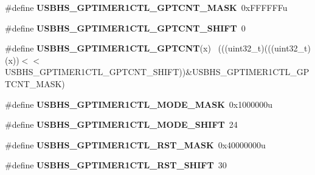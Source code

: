 \begin{DoxyCompactItemize}
\item 
\hypertarget{group___u_s_b_h_s___register___masks_gac15340f15cd15fc43bc24e8092de56a7}{}\#define {\bfseries U\+S\+B\+H\+S\+\_\+\+G\+P\+T\+I\+M\+E\+R1\+C\+T\+L\+\_\+\+G\+P\+T\+C\+N\+T\+\_\+\+M\+A\+S\+K}~0x\+F\+F\+F\+F\+F\+Fu\label{group___u_s_b_h_s___register___masks_gac15340f15cd15fc43bc24e8092de56a7}

\item 
\hypertarget{group___u_s_b_h_s___register___masks_ga408ccd372e46369e1bee04e81c086e9a}{}\#define {\bfseries U\+S\+B\+H\+S\+\_\+\+G\+P\+T\+I\+M\+E\+R1\+C\+T\+L\+\_\+\+G\+P\+T\+C\+N\+T\+\_\+\+S\+H\+I\+F\+T}~0\label{group___u_s_b_h_s___register___masks_ga408ccd372e46369e1bee04e81c086e9a}

\item 
\hypertarget{group___u_s_b_h_s___register___masks_gaa22d27c6e418f4bc92e2f861c50dd464}{}\#define {\bfseries U\+S\+B\+H\+S\+\_\+\+G\+P\+T\+I\+M\+E\+R1\+C\+T\+L\+\_\+\+G\+P\+T\+C\+N\+T}(x)                        ~(((uint32\+\_\+t)(((uint32\+\_\+t)(x))$<$$<$U\+S\+B\+H\+S\+\_\+\+G\+P\+T\+I\+M\+E\+R1\+C\+T\+L\+\_\+\+G\+P\+T\+C\+N\+T\+\_\+\+S\+H\+I\+F\+T))\&U\+S\+B\+H\+S\+\_\+\+G\+P\+T\+I\+M\+E\+R1\+C\+T\+L\+\_\+\+G\+P\+T\+C\+N\+T\+\_\+\+M\+A\+S\+K)\label{group___u_s_b_h_s___register___masks_gaa22d27c6e418f4bc92e2f861c50dd464}

\item 
\hypertarget{group___u_s_b_h_s___register___masks_ga504d07a8ef3af71eb0c166dcc52f4dfb}{}\#define {\bfseries U\+S\+B\+H\+S\+\_\+\+G\+P\+T\+I\+M\+E\+R1\+C\+T\+L\+\_\+\+M\+O\+D\+E\+\_\+\+M\+A\+S\+K}~0x1000000u\label{group___u_s_b_h_s___register___masks_ga504d07a8ef3af71eb0c166dcc52f4dfb}

\item 
\hypertarget{group___u_s_b_h_s___register___masks_gac2c6ef7c3e09ab0e79f78d92f3d02c3a}{}\#define {\bfseries U\+S\+B\+H\+S\+\_\+\+G\+P\+T\+I\+M\+E\+R1\+C\+T\+L\+\_\+\+M\+O\+D\+E\+\_\+\+S\+H\+I\+F\+T}~24\label{group___u_s_b_h_s___register___masks_gac2c6ef7c3e09ab0e79f78d92f3d02c3a}

\item 
\hypertarget{group___u_s_b_h_s___register___masks_ga56e5e0b77501244d090c8c61bf48109f}{}\#define {\bfseries U\+S\+B\+H\+S\+\_\+\+G\+P\+T\+I\+M\+E\+R1\+C\+T\+L\+\_\+\+R\+S\+T\+\_\+\+M\+A\+S\+K}~0x40000000u\label{group___u_s_b_h_s___register___masks_ga56e5e0b77501244d090c8c61bf48109f}

\item 
\hypertarget{group___u_s_b_h_s___register___masks_ga50e8f2375408d676cb2e98ab80d91245}{}\#define {\bfseries U\+S\+B\+H\+S\+\_\+\+G\+P\+T\+I\+M\+E\+R1\+C\+T\+L\+\_\+\+R\+S\+T\+\_\+\+S\+H\+I\+F\+T}~30\label{group___u_s_b_h_s___register___masks_ga50e8f2375408d676cb2e98ab80d91245}


\end{DoxyCompactItemize}
